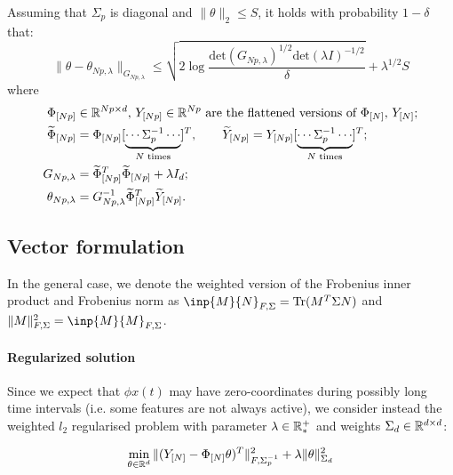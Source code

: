 \documentclass{article}
\begin{document}
\begin{lemma}
Assuming that $\Sigma_p$ is diagonal and $\|\theta\|_2\leq S$, it holds with probability $1-\delta$ that:
\begin{equation*}
    \|\theta - \theta_{Np,\lambda}\|_{G_{Np,\lambda}} \leq \sqrt{2\log \frac{\text{det}(G_{Np,\lambda})^{1/2}\text{det}(\lambda I)^{-1/2}}{\delta}} + \lambda^{1/2}S
\end{equation*}
where
\begin{align*}
    \Phi_{[Np]}& \in\mathbb{R}^{Np\times d},\, Y_{[Np]}\in \mathbb{R}^{Np} \text{ are the flattened versions of $\Phi_{[N]}$, $Y_{[N]}$};\\
    \widetilde{\Phi}_{[Np]} &= \Phi_{[Np]} [\underbrace{\cdots \Sigma_p^{-1} \cdots}_{\text{$N$ times}}]^T, \qquad  \widetilde{Y}_{[Np]} = Y_{[Np]} [\underbrace{\cdots \Sigma_p^{-1} \cdots}_{\text{$N$ times}}]^T;\\
    G_{Np, \lambda} &= \widetilde{\Phi}^T_{[Np]}\widetilde{\Phi}_{[Np]} + \lambda I_d;\\
    \theta_{Np,\lambda} &= G_{Np, \lambda}^{-1} \widetilde{\Phi}^T_{[Np]}\widetilde{Y}_{[Np]}.
\end{align*}
\end{lemma}

\subsection{Vector formulation}
In the general case, we denote the weighted version of the Frobenius inner product and Frobenius norm as $\inp{M}{N}_{F,\Sigma} = \Tr (M^T \Sigma N)$ and $\|M\|_{F,\Sigma}^2 = \inp{M}{M}_{F,\Sigma}$.

\paragraph{Regularized solution} Since we expect that $\phi x(t)$ may have zero-coordinates during possibly long time intervals (i.e. some features are not always active), we consider instead the weighted $l_2$ regularised problem with parameter $\lambda\in\mathbb{R}^+_*$ and weights $\Sigma_d\in\mathbb{R}^{d\times d}$:

\begin{equation}
    \label{eq:regression_min}
    \min_{\theta\in\mathbb{R}^d} \|(Y_{[N]} -\Phi_{[N]}\theta)^T\|_{F,\Sigma_p^{-1}}^2 + \lambda\|\theta\|_{\Sigma_d}^2
\end{equation}

\end{document}
